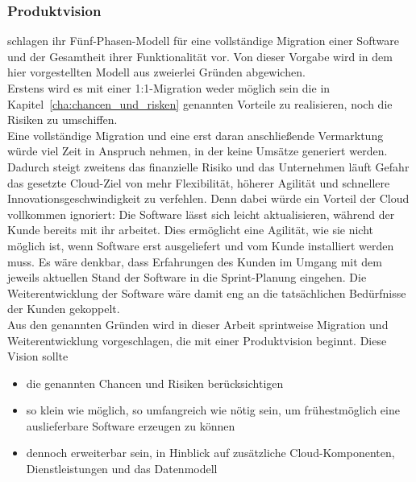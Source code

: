 \subsubsection{Produktvision}
 schlagen ihr Fünf-Phasen-Modell für eine vollständige 
Migration einer Software und der Gesamtheit ihrer Funktionalität vor. Von 
dieser Vorgabe wird in dem hier vorgestellten Modell aus zweierlei Gründen 
abgewichen. \\
Erstens wird es mit einer 1:1-Migration weder möglich sein die in 
Kapitel~\ref{cha:chancen_und_risken} genannten Vorteile zu realisieren, noch 
die Risiken zu umschiffen. \\
Eine vollständige Migration und eine erst daran anschließende Vermarktung würde 
viel Zeit in Anspruch nehmen, in der keine Umsätze generiert werden. Dadurch 
steigt zweitens das finanzielle Risiko und das Unternehmen läuft Gefahr das 
gesetzte Cloud-Ziel von mehr Flexibilität, höherer Agilität und schnellere 
Innovationsgeschwindigkeit zu verfehlen. Denn dabei würde ein Vorteil der 
Cloud vollkommen ignoriert: Die Software lässt sich leicht aktualisieren, 
während der Kunde bereits mit ihr arbeitet. Dies ermöglicht eine Agilität, wie 
sie nicht möglich ist, wenn Software erst ausgeliefert und vom Kunde installiert 
werden muss. Es wäre denkbar, dass Erfahrungen des Kunden im Umgang mit dem 
jeweils aktuellen Stand der Software in die Sprint-Planung eingehen. Die 
Weiterentwicklung der Software wäre damit eng an die tatsächlichen Bedürfnisse 
der Kunden gekoppelt. \\

Aus den genannten Gründen wird in dieser Arbeit sprintweise Migration und 
Weiterentwicklung vorgeschlagen, die mit einer Produktvision beginnt. Diese 
Vision sollte
\begin{itemize}
	\item die genannten Chancen und Risiken berücksichtigen
	\item so klein wie möglich, so umfangreich wie nötig sein, um 
frühestmöglich eine auslieferbare Software erzeugen zu können
	\item dennoch erweiterbar sein, in Hinblick auf zusätzliche 
Cloud-Komponenten, Dienstleistungen und das Datenmodell
\end{itemize} 

